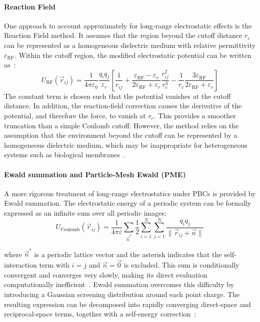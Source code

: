 \paragraph{Reaction Field}
One approach to account approximately for long-range electrostatic effects is the Reaction Field method. It assumes that the region beyond the cutoff distance $r_c$ can be represented as a homogeneous dielectric medium with relative permittivity $\varepsilon_{\mathrm{RF}}$. Within the cutoff region, the modified electrostatic potential can be written as~\cite{reaction_field}:
\begin{equation}\label{eq:reactionfield}
U_{\mathrm{RF}}(\vec{r}_{ij}) =
\frac{1}{4\pi\varepsilon_0}
\frac{q_iq_j}{\varepsilon_r}
\left[\frac{1}{r_{ij}}+\frac{\varepsilon_{\mathrm{RF}}-\varepsilon_r}{2\varepsilon_{\mathrm{RF}}+\varepsilon_r}
\frac{r_{ij}^{2}}{r_c^{3}}-\frac{1}{r_c}
\frac{3\varepsilon_{\mathrm{RF}}}{2\varepsilon_{\mathrm{RF}}+\varepsilon_r}
\right]
\end{equation}
The constant term is chosen such that the potential vanishes at the cutoff distance. In addition, the reaction-field correction causes the derivative of the potential, and therefore the force, to vanish at $r_c$. This provides a smoother truncation than a simple Coulomb cutoff.
However, the method relies on the assumption that the environment beyond the cutoff can be represented by a homogeneous dielectric medium, which may be inappropriate for heterogeneous systems such as biological membranes~\cite{termo_metad_presion}.
\paragraph{Ewald summation and Particle-Mesh Ewald (PME)}
A more rigorous treatment of long-range electrostatics under PBCs is provided by Ewald summation. The electrostatic energy of a periodic system can be formally expressed as an infinite sum over all periodic images:
\begin{equation}\label{eq:coulomb_periodic}
    U_{\text{Coulomb}}(\vec{r}_{ij}) = \frac{1}{4\pi\varepsilon} \sum_{\vec{n}^*} \frac{1}{2} \sum_{i=1}^{N} \sum_{j=1}^{N} \frac{q_i q_j}{\|\vec{r}_{ij} + \vec{n}\|}
\end{equation}

where $\vec{n}^*$ is a periodic lattice vector and the asterisk indicates that the self-interaction term with $i=j$ and $\vec{n}=\vec{0}$ is excluded. This sum is conditionally convergent and converges very slowly,
making its direct evaluation computationally inefficient~\cite{Ewald1921,Frenkel2023}.
Ewald summation overcomes this difficulty by introducing a Gaussian screening distribution around each point charge. The resulting expression can be decomposed into rapidly converging direct-space and reciprocal-space terms, together with a self-energy correction~\cite{pme}:

